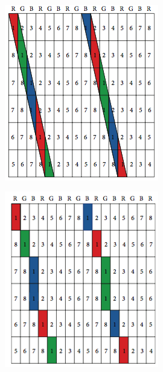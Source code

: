 \begin{figure}[htbp]
\centering
     \begin{subfigure}[b]{0.4\textwidth}
        \includegraphics[width=\textwidth]{./Template_Figures/tilted_sheet}
        \caption{ }\label{fig:tilted_sheet}
    \end{subfigure}
    \begin{subfigure}[b]{0.4\textwidth}
        \includegraphics[width=\textwidth]{./Template_Figures/tilted_sheet_views}

\end{subfigure}
\end{figure}
